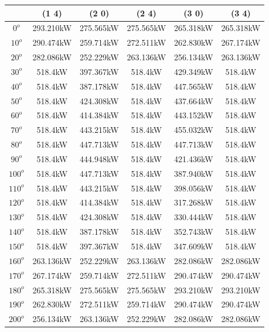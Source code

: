         \begin{table}[H]
        	\centering
        	\begin{tabular}{|c|c|c|c|c|c|} \hline
        			& (1 4)		& (2 0)		& (2 4)		& (3 0)		& (3 4)		\\ \hline
		$0^o$	& 293.210kW	& 275.565kW	& 275.565kW	& 265.318kW	& 265.318kW	\\ \hline
		$10^o$	& 290.474kW	& 259.714kW	& 272.511kW	& 262.830kW	& 267.174kW	\\ \hline
		$20^o$	& 282.086kW	& 252.229kW	& 263.136kW	& 256.134kW	& 263.136kW	\\ \hline
		$30^o$	& 518.4kW	& 397.367kW	& 518.4kW	& 429.349kW	& 518.4kW	\\ \hline
		$40^o$	& 518.4kW	& 387.178kW	& 518.4kW	& 447.565kW	& 518.4kW	\\ \hline
		$50^o$	& 518.4kW	& 424.308kW	& 518.4kW	& 437.664kW	& 518.4kW	\\ \hline
		$60^o$	& 518.4kW	& 414.384kW	& 518.4kW	& 443.152kW	& 518.4kW	\\ \hline
		$70^o$	& 518.4kW	& 443.215kW	& 518.4kW	& 455.032kW	& 518.4kW	\\ \hline
		$80^o$	& 518.4kW	& 447.713kW	& 518.4kW	& 447.713kW	& 518.4kW	\\ \hline
		$90^o$	& 518.4kW	& 444.948kW	& 518.4kW	& 421.436kW	& 518.4kW	\\ \hline
		$100^o$	& 518.4kW	& 447.713kW	& 518.4kW	& 387.940kW	& 518.4kW	\\ \hline
		$110^o$	& 518.4kW	& 443.215kW	& 518.4kW	& 398.056kW	& 518.4kW	\\ \hline
		$120^o$	& 518.4kW	& 414.384kW	& 518.4kW	& 317.268kW	& 518.4kW	\\ \hline
		$130^o$	& 518.4kW	& 424.308kW	& 518.4kW	& 330.444kW	& 518.4kW	\\ \hline
		$140^o$	& 518.4kW	& 387.178kW	& 518.4kW	& 352.743kW	& 518.4kW	\\ \hline
		$150^o$	& 518.4kW	& 397.367kW	& 518.4kW	& 347.609kW	& 518.4kW	\\ \hline
		$160^o$	& 263.136kW	& 252.229kW	& 263.136kW	& 282.086kW	& 282.086kW	\\ \hline
		$170^o$	& 267.174kW	& 259.714kW	& 272.511kW	& 290.474kW	& 290.474kW	\\ \hline
		$180^o$	& 265.318kW	& 275.565kW	& 275.565kW	& 293.210kW	& 293.210kW	\\ \hline
		$190^o$	& 262.830kW	& 272.511kW	& 259.714kW	& 290.474kW	& 290.474kW	\\ \hline
		$200^o$	& 256.134kW	& 263.136kW	& 252.229kW	& 282.086kW	& 282.086kW	\\ \hline

\end{tabular}
\end{table}
